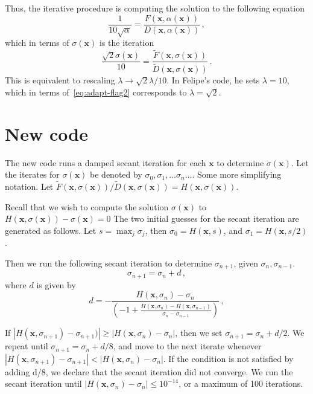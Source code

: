 \documentclass[11pt, oneside]{article}   	%
\newcommand\bx{\boldsymbol x}
\begin{document}
Thus, the iterative procedure is computing the solution to the following equation
\begin{equation}
\frac{1}{10\sqrt{\alpha}} = \frac{F(\bx,\alpha(\bx))}{D(\bx,\alpha(\bx))} \, ,
\end{equation}
which in terms of $\sigma(\bx)$ is the iteration
\begin{equation}
\frac{\sqrt{2}\sigma(\bx)}{10} = \frac{\tilde{F}(\bx,\sigma(\bx))}{\tilde{D}(\bx,\sigma(\bx))} \, .
\end{equation}
This is equivalent to rescaling $\lambda \to \sqrt{2}\lambda /10$. 
In Felipe's code, he sets $\lambda = 10$, which in terms of~\cref{eq:adapt-flag2}
corresponds to $\lambda = \sqrt{2}$. 

\section{New code}
The new code runs a damped secant iteration for each $\bx$ to determine 
$\sigma(\bx)$.
Let the iterates for $\sigma(\bx)$ be denoted by
$\sigma_{0}, \sigma_{1}, \ldots \sigma_{n} \ldots$.
Some more simplifying notation. 
Let $\tilde{F}(\bx,\sigma(\bx))/\tilde{D}(\bx,\sigma(\bx)) = H(\bx,\sigma(\bx))$.

Recall that we wish to compute the solution $\sigma(\bx)$ to
$H(\bx,\sigma(\bx)) - \sigma(\bx) = 0$
The two initial guesses for the secant iteration are generated as follows.
Let $s = \max_{j} \sigma_{j}$, then
$\sigma_{0} = H(\bx,s)$, and
$\sigma_{1} = H(\bx,s/2)$.

Then we run the following secant iteration to determine
$\sigma_{n+1}$, given $\sigma_{n}, \sigma_{n-1}$.
\begin{equation}
\sigma_{n+1} = \sigma_{n} + d \, , 
\end{equation}
where $d$ is given by
\begin{equation}
d = -\frac{H(\bx,\sigma_{n}) - \sigma_{n}}{\left(-1 + \frac{H(\bx,\sigma_{n}) - H(\bx,\sigma_{n-1})}{\sigma_{n}-\sigma_{n-1}} \right)}  \, ,
\end{equation}

If $|H(\bx,\sigma_{n+1}) - \sigma_{n+1})| \geq |H(\bx,\sigma_{n}) - \sigma_{n}|$, 
then we set 
$\sigma_{n+1} = \sigma_{n} + d/2$.
We repeat until $\sigma_{n+1} = \sigma_{n} + d/8$, and move to the next
iterate whenever
$|H(\bx,\sigma_{n+1}) - \sigma_{n+1}| < |H(\bx,\sigma_{n}) - \sigma_{n}|$.
If the condition is not satisfied by adding d/8, we declare that the secant
iteration did not converge.
We run the secant iteration until $|H(\bx,\sigma_{n}) - \sigma_{n}| \leq 10^{-14}$,
or a maximum of 100 iterations.
\end{document}
